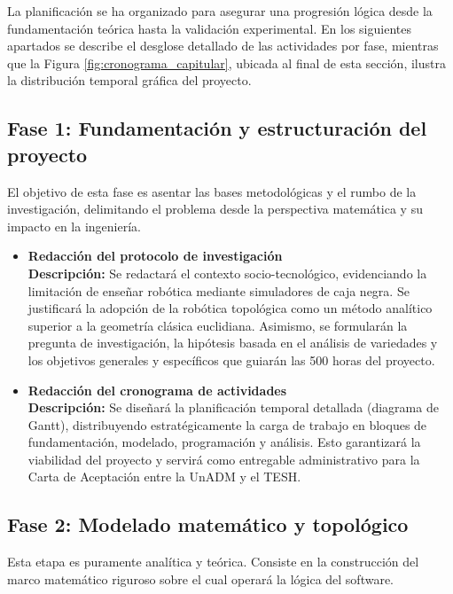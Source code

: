 La planificación se ha organizado para asegurar una progresión lógica 
desde la fundamentación teórica hasta la validación experimental. En los siguientes 
apartados se describe el desglose detallado de las actividades por fase, mientras 
que la Figura \ref{fig:cronograma_capitular}, ubicada al final de esta sección, ilustra la 
distribución temporal gráfica del proyecto.

\subsection*{Fase 1: Fundamentación y estructuración del proyecto}
El objetivo de esta fase es asentar las bases metodológicas y el rumbo de la investigación, delimitando el problema desde la perspectiva matemática y su impacto en la ingeniería.

\begin{itemize}
    \item \textbf{Redacción del protocolo de investigación} \\
    \textbf{Descripción:} Se redactará el contexto socio-tecnológico, evidenciando la limitación de enseñar robótica mediante simuladores de caja negra. Se justificará la adopción de la robótica topológica como un método analítico superior a la geometría clásica euclidiana. Asimismo, se formularán la pregunta de investigación, la hipótesis basada en el análisis de variedades y los objetivos generales y específicos que guiarán las 500 horas del proyecto.

    \item \textbf{Redacción del cronograma de actividades} \\
    \textbf{Descripción:} Se diseñará la planificación temporal detallada (diagrama de Gantt), distribuyendo estratégicamente la carga de trabajo en bloques de fundamentación, modelado, programación y análisis. Esto garantizará la viabilidad del proyecto y servirá como entregable administrativo para la Carta de Aceptación entre la UnADM y el TESH.
\end{itemize}

\subsection*{Fase 2: Modelado matemático y topológico}
Esta etapa es puramente analítica y teórica. Consiste en la construcción del marco matemático riguroso sobre el cual operará la lógica del software.

